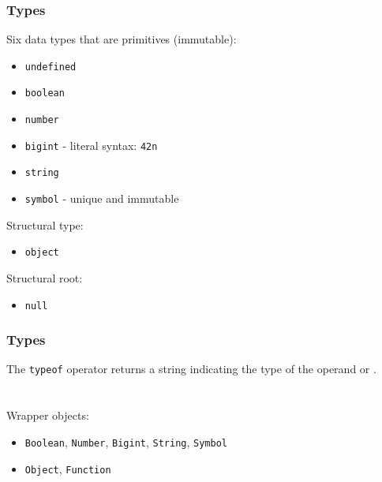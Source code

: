 \begin{frame}[fragile]
  \frametitle{Types}
Six data types that are primitives (immutable):
\begin{itemize}
  \item  \verb|undefined|
  \item  \verb|boolean|
  \item  \verb|number|
  \item  \verb|bigint| - literal syntax: \verb|42n|
  \item  \verb|string|
  \item  \verb|symbol| - unique and immutable
\end{itemize}
Structural type:
\begin{itemize}
  \item  \verb|object|
\end{itemize}
Structural root:
\begin{itemize}
  \item  \verb|null|
\end{itemize}
\end{frame}

\begin{frame}[fragile]
  \frametitle{Types}
The \verb|typeof| operator returns a string indicating the type of the operand or .
\\ \vspace{5 mm}
\\
\\ \vspace{5 mm}
Wrapper objects:
\begin{itemize}
  \item  \verb|Boolean|, \verb|Number|, \verb|Bigint|, \verb|String|, \verb|Symbol|
  \item  \verb|Object|, \verb|Function|
\end{itemize}
\vspace{5 mm}
\end{frame}

